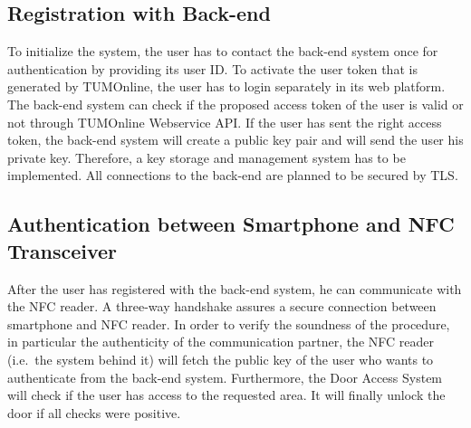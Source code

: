 \subsection{Registration with Back-end}
To initialize the system, the user has to contact the back-end system once for authentication by providing its user ID.
To activate the user token that is generated by TUMOnline, the user has to login separately in its web platform. 
The back-end system can check if the proposed access token of the user is valid or not through TUMOnline Webservice API.
If the user has sent the right access token, the back-end system will create a public key pair and will send the user his private key. Therefore, a key storage and management system has to be implemented.
All connections to the back-end are planned to be secured by TLS.


\subsection{Authentication between Smartphone and NFC Transceiver}
After the user has registered with the back-end system, he can communicate with the NFC reader. 
A three-way handshake assures a secure connection between smartphone and NFC reader.
In order to verify the soundness of the procedure, in particular the authenticity of the communication partner, the NFC reader (i.e.~the system behind it) will fetch the public key of the user who wants to authenticate from the back-end system.
Furthermore, the Door Access System will check if the user has access to the requested area.
It will finally unlock the door if all checks were positive.
